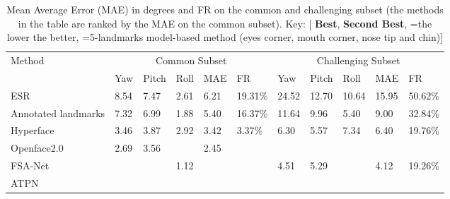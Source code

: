 \documentclass[3p,twocolumn, round, sort & compress]{elsarticle}
\begin{document}
\begin{table*}[t!]
	\centering
	\begin{tabular}{m{4.2cm}<{\centering}|m{0.6cm}<{\centering}m{0.7cm}<{\centering}m{0.6cm}<{\centering}m{0.7cm}<{\centering}m{1.0cm}<{\centering}|m{0.6cm}<{\centering}m{0.7cm}<{\centering}m{0.6cm}<{\centering}m{0.7cm}<{\centering}m{1.0cm}<{\centering}}
		\hline
		\multirow{2}{*}{Method} & \multicolumn{5}{c|}{Common Subset}   & \multicolumn{5}{c}{Challenging Subset}  \\ \cline{2-11} 
		& Yaw  & Pitch & Roll & MAE  & FR   & Yaw   & Pitch & Roll  & MAE   & FR   \\ \hline
		ESR \citep{ESR} & 8.54 & 7.47  & 2.61 & 6.21 & 19.31\% & 24.52 & 12.70 & 10.64 & 15.95 & 50.62\% \\
		Annotated landmarks   & 7.32 & 6.99  & 1.88 & 5.40 & 16.37\% & 11.64 & 9.96  & 5.40  & 9.00  & 32.84\% \\  
		Hyperface \citep{Hyperface} & 3.46 & 3.87  & 2.92 & 3.42 & 3.37\%  & 6.30  & 5.57  & 7.34  & 6.40  & 19.76\% \\
		Openface2.0 \citep{Openface} & 2.69 & 3.56  & {\color{blue} } & 2.45 & {\color{blue} }  & {\color{blue} }  &{\color{red}  }  & {\color{red} }  & {\color{blue} }  & {\color{blue} }  \\
		FSA-Net \citep{FSA-Net} & {\color{blue} } & {\color{blue} }  & 1.12 & {\color{blue} } & {\color{blue} }  & 4.51  & 5.29  & {\color{blue} }  & 4.12  & 19.26\% \\
		ATPN  & {\color{red} } & {\color{red} }  & {\color{red} } & {\color{red} } & {\color{red} }  & {\color{red} }  & {\color{blue} }  & {\color{red} \bm{}}  & {\color{red} }  & {\color{red} }  \\ \hline
	\end{tabular}
	\caption{Mean Average Error (MAE) in degrees and FR on the common and challenging subset (the methods in the table are ranked by the MAE on the common subset). Key: [{\color{red} \textbf{Best}}, {\color{blue} \textbf{Second Best}}, =the lower the better, =5-landmarks model-based method (eyes corner, mouth corner, nose tip and chin)]}
	\label{Tabal6}
\end{table*}
\end{document}
